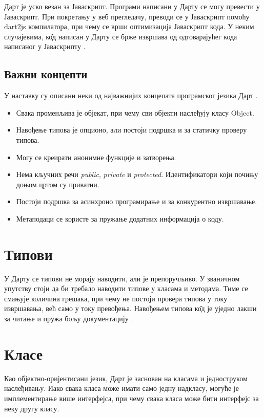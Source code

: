 \documentclass[12pt,oneside]{memoir}
\begin{document}
Дарт је уско везан за Јаваскрипт. Програми написани у Дарту се могу превести у Јаваскрипт. При покретању у веб прегледачу, преводи се у Јаваскрипт помоћу dart2js компилатора, при чему се врши оптимизација Јаваскрипт кода. У неким случајевима, к\^{о}д написан у Дарту се брже извршава од одговарајућег кода написаног у Јаваскрипту \cite{dart, dart1}.


\subsection{Важни концепти}
У наставку су описани неки од најважнијих концепата програмског језика Дарт \cite{dart, dart1}.
\begin{itemize}
\item Свака променљива је објекат, при чему сви објекти наслеђују класу Object.
\item Навођење типова је опционо, али постоји подршка и за статичку проверу типова.
\item Могу се креирати анонимне функције и затворења.
\item Нема кључних речи \textit{public}, \textit{private} и \textit{protected}. Идентификатори који почињу доњом цртом су приватни.
\item Постоји подршка за асинхроно програмирање и за конкурентно извршавање.
\item Метаподаци се користе за пружање додатних информација о коду.
\end{itemize}

\section{Типови}
\label{tipovi}

У Дарту се типови не морају наводити, али је препоручљиво. У званичном упутству стоји да би требало наводити типове у класама и методама. Тиме се смањује количина грешака, при чему не постоји провера типова у току извршавања, већ само у току превођења. Навођењем типова к\^{о}д је уједно лакши за читање и пружа бољу документацију \cite{dart, dart1}. 

\section{Класе}
\label{klase}
Као објектно-оријентисани језик, Дарт је заснован на класама и једноструком наслеђивању. Иако свака класа може имати само једну надкласу, могуће је имплементирање више интерфејса, при чему свака класа може бити интерфејс за неку другу класу. 
\end{document}
